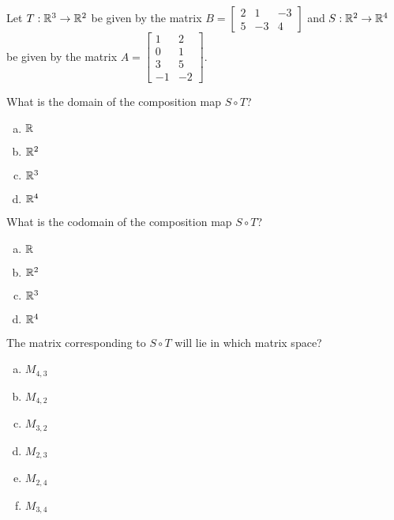 
\begin{applicationActivities}{1}{22}

\begin{activity}{0}
Let $T: \mathbb{R}^3 \rightarrow \mathbb{R}^2$ be given by the matrix $B=\begin{bmatrix} 2 & 1 & -3 \\ 5 & -3 & 4 \end{bmatrix}$ and $S: \mathbb{R}^2 \rightarrow \mathbb{R}^4$ be given by the matrix $A=\begin{bmatrix} 1 & 2 \\ 0 & 1 \\ 3 & 5 \\ -1 & -2 \end{bmatrix}$.

What is the domain of the composition map $S \circ T$?
\begin{enumerate}[(a)]
\item $\mathbb{R}$
\item $\mathbb{R}^2$
\item $\mathbb{R}^3$
\item $\mathbb{R}^4$
\end{enumerate}
\end{activity}

\begin{activity}{0}
What is the codomain of the composition map $S \circ T$?
\begin{enumerate}[(a)]
\item $\mathbb{R}$
\item $\mathbb{R}^2$
\item $\mathbb{R}^3$
\item $\mathbb{R}^4$
\end{enumerate}
\end{activity}

\begin{activity}{0}
The matrix corresponding to $S \circ T$ will lie in which matrix space?
\begin{enumerate}[(a)]
\item $M_{4,3}$
\item $M_{4,2}$
\item $M_{3,2}$
\item $M_{2,3}$
\item $M_{2,4}$
\item $M_{3,4}$
\end{enumerate}
\end{activity}


\end{applicationActivities}

